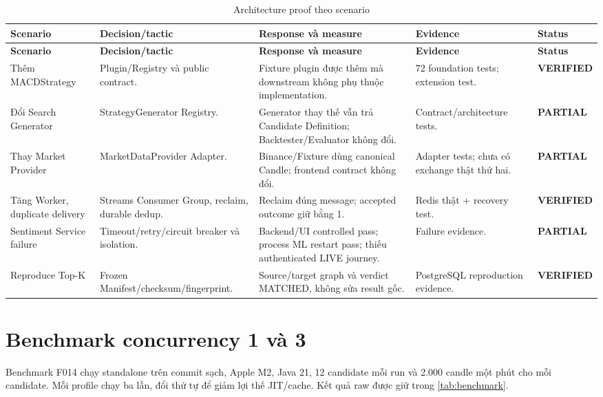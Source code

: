 \documentclass[12pt,a4paper,oneside]{report}
\newcommand{\statusVerified}{\textcolor{Success}{\textbf{VERIFIED}}}
\newcommand{\statusPartial}{\textcolor{Warning}{\textbf{PARTIAL}}}
\begin{document}
\begin{longtable}{L{2.6cm}L{2.8cm}L{3.8cm}L{2cm}L{1.8cm}}
  \caption{Architecture proof theo scenario}\label{tab:architecture-proof}\\
  \toprule
  \textbf{Scenario} & \textbf{Decision/tactic} & \textbf{Response và measure} & \textbf{Evidence} & \textbf{Status} \\
  \midrule
  \endfirsthead
  \toprule
  \textbf{Scenario} & \textbf{Decision/tactic} & \textbf{Response và measure} & \textbf{Evidence} & \textbf{Status} \\
  \midrule
  \endhead
  Thêm MACDStrategy & Plugin/Registry và public contract. & Fixture plugin được thêm mà downstream không phụ thuộc implementation. & 72 foundation tests; extension test. & \statusVerified \\
  Đổi Search Generator & StrategyGenerator Registry. & Generator thay thế vẫn trả Candidate Definition; Backtester/Evaluator không đổi. & Contract/architecture tests. & \statusPartial \\
  Thay Market Provider & MarketDataProvider Adapter. & Binance/Fixture dùng canonical Candle; frontend contract không đổi. & Adapter tests; chưa có exchange thật thứ hai. & \statusPartial \\
  Tăng Worker, duplicate delivery & Streams Consumer Group, reclaim, durable dedup. & Reclaim đúng message; accepted outcome giữ bằng 1. & Redis thật + recovery test. & \statusVerified \\
  Sentiment Service failure & Timeout/retry/circuit breaker và isolation. & Backend/UI controlled pass; process ML restart pass; thiếu authenticated LIVE journey. & Failure evidence. & \statusPartial \\
  Reproduce Top-K & Frozen Manifest/checksum/fingerprint. & Source/target graph và verdict MATCHED, không sửa result gốc. & PostgreSQL reproduction evidence. & \statusVerified \\
  \bottomrule
\end{longtable}

\section{Benchmark concurrency 1 và 3}

Benchmark F014 chạy standalone trên commit sạch, Apple M2, Java 21, 12 candidate mỗi run và 2.000 candle một phút cho mỗi candidate. Mỗi profile chạy ba lần, đổi thứ tự để giảm lợi thế JIT/cache. Kết quả raw được giữ trong \cref{tab:benchmark}.
\end{document}
